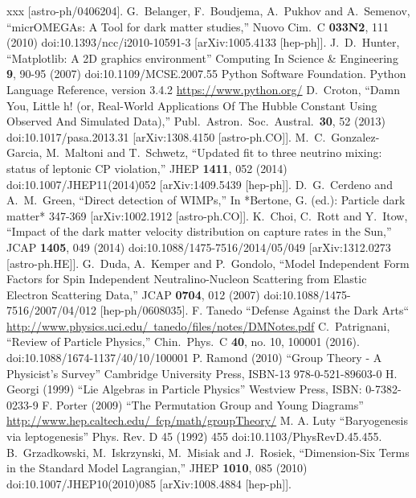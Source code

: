 \begin{thebibliography}{xxx}
  [astro-ph/0406204].
    G.~Belanger, F.~Boudjema, A.~Pukhov and A.~Semenov,
  ``micrOMEGAs: A Tool for dark matter studies,''
  Nuovo Cim.\ C {\bf 033N2}, 111 (2010)
  doi:10.1393/ncc/i2010-10591-3
  [arXiv:1005.4133 [hep-ph]].
  J.~D.~Hunter, 
  ``Matplotlib: A 2D graphics environment''
  Computing In Science \& Engineering {\bf{9}}, 90-95 (2007)
  doi:10.1109/MCSE.2007.55
  Python Software Foundation. Python Language Reference, version 3.4.2 \href{https://www.python.org/}{https://www.python.org/}
    D.~Croton,
  ``Damn You, Little h! (or, Real-World Applications Of The Hubble Constant Using Observed And Simulated Data),''
  Publ.\ Astron.\ Soc.\ Austral.\  {\bf 30}, 52 (2013)
  doi:10.1017/pasa.2013.31
  [arXiv:1308.4150 [astro-ph.CO]].
    M.~C.~Gonzalez-Garcia, M.~Maltoni and T.~Schwetz,
  ``Updated fit to three neutrino mixing: status of leptonic CP violation,''
  JHEP {\bf 1411}, 052 (2014)
  doi:10.1007/JHEP11(2014)052
    [arXiv:1409.5439 [hep-ph]].
    D.~G.~Cerdeno and A.~M.~Green,
  ``Direct detection of WIMPs,''
  In *Bertone, G. (ed.): Particle dark matter* 347-369
  [arXiv:1002.1912 [astro-ph.CO]].
    K.~Choi, C.~Rott and Y.~Itow,
  ``Impact of the dark matter velocity distribution on capture rates in the Sun,''
  JCAP {\bf 1405}, 049 (2014)
  doi:10.1088/1475-7516/2014/05/049
  [arXiv:1312.0273 [astro-ph.HE]].
    G.~Duda, A.~Kemper and P.~Gondolo,
  ``Model Independent Form Factors for Spin Independent Neutralino-Nucleon Scattering from Elastic Electron Scattering Data,''
  JCAP {\bf 0704}, 012 (2007)
  doi:10.1088/1475-7516/2007/04/012
  [hep-ph/0608035].
  F. Tanedo ``Defense Against the Dark Arts``\\ \href{http://www.physics.uci.edu/~tanedo/files/notes/DMNotes.pdf}{http://www.physics.uci.edu/~tanedo/files/notes/DMNotes.pdf}
   C.~Patrignani,
  ``Review of Particle Physics,''
  Chin.\ Phys.\ C {\bf 40}, no. 10, 100001 (2016).
  doi:10.1088/1674-1137/40/10/100001 
  P. Ramond (2010) ``Group Theory - A Physicist's Survey'' Cambridge University Press, ISBN-13 978-0-521-89603-0 
 H. Georgi (1999) ``Lie Algebras in Particle Physics'' Westview Press, ISBN: 0-7382-0233-9
 F. Porter (2009) ``The Permutation Group and Young Diagrams'' \href{http://www.hep.caltech.edu/~fcp/math/groupTheory/}{http://www.hep.caltech.edu/~fcp/math/groupTheory/}
 M. A. Luty ``Baryogenesis via leptogenesis'' Phys. Rev. D 45 (1992) 455 doi:10.1103/PhysRevD.45.455.
  B.~Grzadkowski, M.~Iskrzynski, M.~Misiak and J.~Rosiek,
  ``Dimension-Six Terms in the Standard Model Lagrangian,''
  JHEP {\bf 1010}, 085 (2010)
  doi:10.1007/JHEP10(2010)085
  [arXiv:1008.4884 [hep-ph]].
\end{thebibliography}